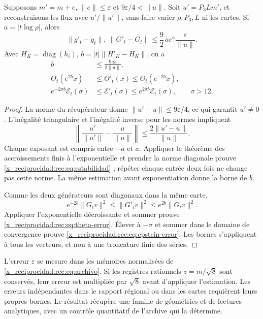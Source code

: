 \begin{theorem}
\label{x_reciprocidad:rec:thm:estabilidad}
Supposons \(m'=m+e\), \(\|e\|\le\varepsilon\) et \(9\varepsilon/4<\|u\|\). Soit \(u'=P_3Lm'\), et reconstruisons les flux avec \(u'/\|u'\|\), sans faire varier \(\rho,P_3,L\) ni les cartes. Si \(a=|t\log\rho|\), alors
\begin{equation}
 \|g'_t-g_t\|,\ \|G'_t-G_t\|
 \le\frac92\,a e^a\frac{\varepsilon}{\|u\|}.
 \label{x_reciprocidad:rec:eq:estabilidad}
\end{equation}
Avec \(H_K=\operatorname{diag}(h_i)\), \(b=|t|\|H'_K-H_K\|\), on a
\begin{align}
 b&\le\frac{9a\varepsilon}{2\|u\|},\nonumber\\
 \Theta_t(e^{2b}x)&\le\Theta'_t(x)\le\Theta_t(e^{-2b}x),\label{x_reciprocidad:rec:eq:theta-error}\\
 e^{-2\sigma b}\mathcal E_t(\sigma)&\le\mathcal E'_t(\sigma)
             \le e^{2\sigma b}\mathcal E_t(\sigma),\qquad\sigma>12.
 \label{x_reciprocidad:rec:eq:epstein-error}
\end{align}
\end{theorem}
\begin{proof}
La norme du récupérateur donne \(\|u'-u\|\le9\varepsilon/4\), ce qui garantit \(u'\ne0\). L’inégalité triangulaire et l’inégalité inverse pour les normes impliquent
\[
 \left\|\frac{u'}{\|u'\|}-\frac{u}{\|u\|}\right\|
 \le\frac{2\|u'-u\|}{\|u\|}.
\]
Chaque exposant est compris entre \(-a\) et \(a\). Appliquer le théorème des accroissements finis à l'exponentielle et prendre la norme diagonale prouve \eqref{x_reciprocidad:rec:eq:estabilidad} ; répéter chaque entrée deux fois ne change pas cette norme. La même estimation avant exponentiation donne la borne de \(b\).

Comme les deux générateurs sont diagonaux dans la même carte,
\[
 e^{-2b}\|G_tv\|^2\le\|G'_tv\|^2\le e^{2b}\|G_tv\|^2.
\]
Appliquer l’exponentielle décroissante et sommer prouve \eqref{x_reciprocidad:rec:eq:theta-error}. Élever à \(-\sigma\) et sommer dans le domaine de convergence prouve \eqref{x_reciprocidad:rec:eq:epstein-error}. Les bornes s’appliquent à tous les vecteurs, et non à une troncature finie des séries.
\end{proof}

L’erreur \(\varepsilon\) se mesure dans les mémoires normalisées de \eqref{x_reciprocidad:rec:eq:archivo}. Si les registres rationnels \(z=m/\sqrt8\) sont conservés, leur erreur est multipliée par \(\sqrt8\) avant d’appliquer l’estimation. Les erreurs indépendantes dans le rapport régional ou dans les cartes requièrent leurs propres bornes. Le résultat récupère une famille de géométries et de lectures analytiques, avec un contrôle quantitatif de l’archive qui la détermine.

